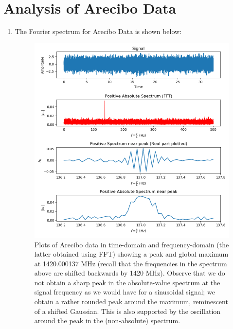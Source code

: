 \documentclass[11pt]{article}
\begin{document}
\section{Analysis of Arecibo Data}
\begin{enumerate}
\item The Fourier spectrum for Arecibo Data is shown below:
\begin{figure}[!hbtp]
\centering
\includegraphics[scale=0.90]{arecibo_plot.png}
\caption{Plots of Arecibo data in time-domain and frequency-domain (the latter obtained using FFT) showing a peak and global maximum at 1420.000137 MHz (recall that the frequencies in the spectrum above are shifted backwards by 1420 MHz). Observe that we do not obtain a sharp peak in the absolute-value spectrum at the signal frequency as we would have for a sinusoidal signal; we obtain a rather rounded peak around the maximum, reminescent of a shifted Gaussian. This is also supported by the oscillation around the peak in the (non-absolute) spectrum.}
\label{arecibo_1}
\end{figure}
\newpage


\end{enumerate}
\end{document}
